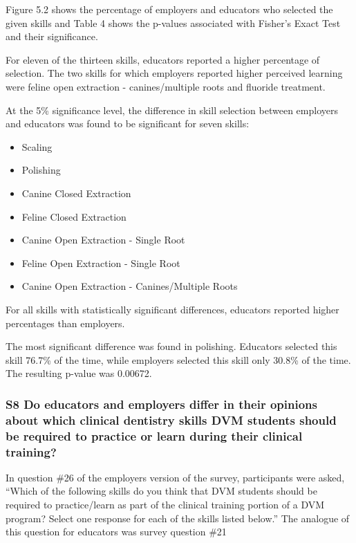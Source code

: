 \documentclass[
  11pt,
  letterpaper,
  DIV=11,
  numbers=noendperiod]{scrartcl}
\providecommand{\tightlist}{%
  \setlength{\itemsep}{0pt}\setlength{\parskip}{0pt}}\usepackage{longtable,booktabs,array}
\numberwithin{figure}{section}
\begin{document}
Figure 5.2 shows the percentage of employers and educators who selected
the given skills and Table 4 shows the p-values associated with Fisher's
Exact Test and their significance.

For eleven of the thirteen skills, educators reported a higher
percentage of selection. The two skills for which employers reported
higher perceived learning were feline open extraction - canines/multiple
roots and fluoride treatment.

At the 5\% significance level, the difference in skill selection between
employers and educators was found to be significant for seven skills:

\begin{itemize}
\tightlist
\item
  Scaling
\item
  Polishing
\item
  Canine Closed Extraction
\item
  Feline Closed Extraction
\item
  Canine Open Extraction - Single Root
\item
  Feline Open Extraction - Single Root
\item
  Canine Open Extraction - Canines/Multiple Roots
\end{itemize}

For all skills with statistically significant differences, educators
reported higher percentages than employers.

The most significant difference was found in polishing. Educators
selected this skill 76.7\% of the time, while employers selected this
skill only 30.8\% of the time. The resulting p-value was 0.00672.

\subsubsection{S8 Do educators and employers differ in their opinions
about which clinical dentistry skills DVM students should be required to
practice or learn during their clinical
training?}\label{s8-do-educators-and-employers-differ-in-their-opinions-about-which-clinical-dentistry-skills-dvm-students-should-be-required-to-practice-or-learn-during-their-clinical-training}

In question \#26 of the employers version of the survey, participants
were asked, ``Which of the following skills do you think that DVM
students should be required to practice/learn as part of the clinical
training portion of a DVM program? Select one response for each of the
skills listed below.'' The analogue of this question for educators was
survey question \#21
\end{document}

